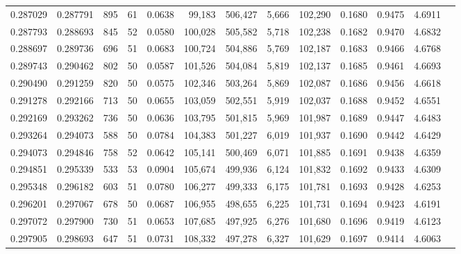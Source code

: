 \begin{tabular}{rrrrrrrrrrrrr}
0.287029 & 0.287791 &   895 &  61 &                                     0.0638 &  99,183 & 506,427 &   5,666 & 102,290 & 0.1680 & 0.9475 & 4.6911 \\
0.287793 & 0.288693 &   845 &  52 &                                     0.0580 & 100,028 & 505,582 &   5,718 & 102,238 & 0.1682 & 0.9470 & 4.6832 \\
0.288697 & 0.289736 &   696 &  51 &                                     0.0683 & 100,724 & 504,886 &   5,769 & 102,187 & 0.1683 & 0.9466 & 4.6768 \\
0.289743 & 0.290462 &   802 &  50 &                                     0.0587 & 101,526 & 504,084 &   5,819 & 102,137 & 0.1685 & 0.9461 & 4.6693 \\
0.290490 & 0.291259 &   820 &  50 &                                     0.0575 & 102,346 & 503,264 &   5,869 & 102,087 & 0.1686 & 0.9456 & 4.6618 \\
0.291278 & 0.292166 &   713 &  50 &                                     0.0655 & 103,059 & 502,551 &   5,919 & 102,037 & 0.1688 & 0.9452 & 4.6551 \\
0.292169 & 0.293262 &   736 &  50 &                                     0.0636 & 103,795 & 501,815 &   5,969 & 101,987 & 0.1689 & 0.9447 & 4.6483 \\
0.293264 & 0.294073 &   588 &  50 &                                     0.0784 & 104,383 & 501,227 &   6,019 & 101,937 & 0.1690 & 0.9442 & 4.6429 \\
0.294073 & 0.294846 &   758 &  52 &                                     0.0642 & 105,141 & 500,469 &   6,071 & 101,885 & 0.1691 & 0.9438 & 4.6359 \\
0.294851 & 0.295339 &   533 &  53 &                                     0.0904 & 105,674 & 499,936 &   6,124 & 101,832 & 0.1692 & 0.9433 & 4.6309 \\
0.295348 & 0.296182 &   603 &  51 &                                     0.0780 & 106,277 & 499,333 &   6,175 & 101,781 & 0.1693 & 0.9428 & 4.6253 \\
0.296201 & 0.297067 &   678 &  50 &                                     0.0687 & 106,955 & 498,655 &   6,225 & 101,731 & 0.1694 & 0.9423 & 4.6191 \\
0.297072 & 0.297900 &   730 &  51 &                                     0.0653 & 107,685 & 497,925 &   6,276 & 101,680 & 0.1696 & 0.9419 & 4.6123 \\
0.297905 & 0.298693 &   647 &  51 &                                     0.0731 & 108,332 & 497,278 &   6,327 & 101,629 & 0.1697 & 0.9414 & 4.6063 \\

\end{tabular}
